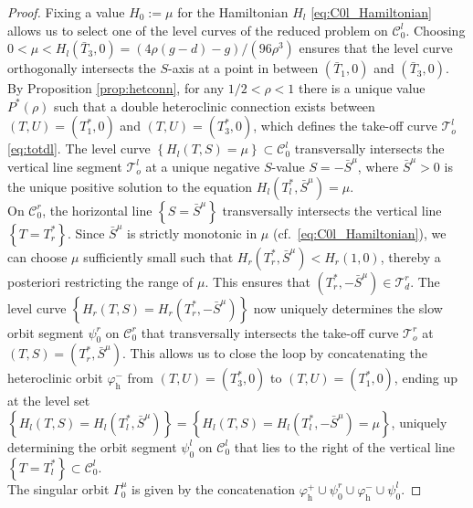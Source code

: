 \documentclass[a4paper,10pt,abstract=true,parskip=true]{scrartcl}
\theoremstyle{remark}
\numberwithin{equation}{section}
\numberwithin{thm}{section}
\begin{document}
\begin{proof}
Fixing a value $H_0 := \mu$ for the Hamiltonian $H_l$ \eqref{eq:C0l_Hamiltonian}
allows us to select one of the level curves of the reduced problem on $\mathcal{C}_0^l$. Choosing $0 < \mu < H_l(\bar{T}_3,0) = (4 \rho(g-d)-g)/(96 \rho^3)$ ensures that the level curve orthogonally intersects the $S$-axis at a point in between $(\bar{T}_1,0)$ and $(\bar{T}_3,0)$.\\
By Proposition \ref{prop:hetconn}, for any $1/2 < \rho < 1$ there is a unique value $P^\ast(\rho)$ such that a double heteroclinic connection exists between $(T,U) = (T^\ast_1,0)$ and $(T,U) = (T^\ast_3,0)$, which defines the take-off curve $\mathcal{T}_o^l$ \eqref{eq:totdl}. The level curve $\left\{H_l(T,S) = \mu\right\} \subset \mathcal{C}_0^l$ transversally intersects the vertical line segment $\mathcal{T}_o^l$ at a unique negative $S$-value $S=-\bar{S}^\mu$, where $\bar{S}^\mu>0$ is the unique positive solution to the equation $H_l(T^\ast_l,\bar{S}^\mu) = \mu$.\\
On $\mathcal{C}_0^r$, the horizontal line $\left\{S = \bar{S}^\mu\right\}$ transversally intersects the vertical line $\left\{T = T^\ast_r\right\}$. Since $\bar{S}^\mu$ is strictly monotonic in $\mu$ (cf.~\eqref{eq:C0l_Hamiltonian}), we can choose $\mu$ sufficiently small such that $H_r(T^\ast_r,\bar{S}^\mu) < H_r(1,0)$, thereby a posteriori restricting the range of $\mu$. This ensures that $(T^\ast_r,-\bar{S}^\mu) \in \mathcal{T}_d^r$. The level curve $\left\{H_r(T,S) = H_r(T^\ast_r,-\bar{S}^\mu)\right\}$ now uniquely determines the slow orbit segment $\psi_0^r$ on $\mathcal{C}_0^r$ that transversally intersects the take-off curve $\mathcal{T}_o^r$ at $(T,S) = (T^\ast_r,\bar{S}^\mu)$. This allows us to close the loop by concatenating the heteroclinic orbit $\varphi_\mathrm{h}^-$ from $(T,U) = (T^\ast_3,0)$ to $(T,U) = (T^\ast_1,0)$, ending up at the level set $\left\{H_l(T,S) = H_l(T^\ast_l,\bar{S}^\mu)\right\} = \left\{H_l(T,S) = H_l(T^\ast_l,-\bar{S}^\mu) = \mu\right\}$, uniquely determining the orbit segment $\psi_0^l$ on $\mathcal{C}_0^l$ that lies to the right of the vertical line $\left\{T = T^\ast_l\right\} \subset \mathcal{C}_0^l$.\\
The singular orbit $\Gamma_0^\mu$ is given by the concatenation $\varphi_\mathrm{h}^+ \cup \psi_0^r \cup \varphi_\mathrm{h}^- \cup \psi_0^l$.

\end{proof}
\end{document}
